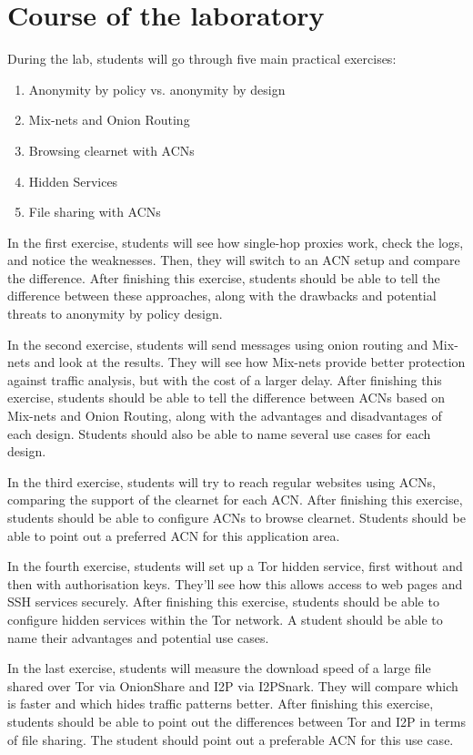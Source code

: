 \section{Course of the laboratory}
During the lab, students will go through five main practical exercises:
\begin{enumerate}
    \item Anonymity by policy vs. anonymity by design
    \item Mix-nets and Onion Routing
    \item Browsing clearnet with ACNs
    \item Hidden Services
    \item File sharing with ACNs
\end{enumerate}

In the first exercise, students will see how single-hop proxies work, check the logs, and notice the weaknesses. Then, they will switch to an ACN setup and compare the difference. After finishing this exercise, students should be able to tell the difference between these approaches, along with the drawbacks and potential threats to anonymity by policy design.

In the second exercise, students will send messages using onion routing and Mix-nets and look at the results. They will see how Mix-nets provide better protection against traffic analysis, but with the cost of a larger delay. After finishing this exercise, students should be able to tell the difference between ACNs based on Mix-nets and Onion Routing, along with the advantages and disadvantages of each design. Students should also be able to name several use cases for each design.

In the third exercise, students will try to reach regular websites using ACNs, comparing the support of the clearnet for each ACN. After finishing this exercise, students should be able to configure ACNs to browse clearnet. Students should be able to point out a preferred ACN for this application area.

In the fourth exercise, students will set up a Tor hidden service, first without and then with authorisation keys. They’ll see how this allows access to web pages and SSH services securely. After finishing this exercise, students should be able to configure hidden services within the Tor network. A student should be able to name their advantages and potential use cases.

In the last exercise, students will measure the download speed of a large file shared over Tor via OnionShare and I2P via I2PSnark. They will compare which is faster and which hides traffic patterns better. After finishing this exercise, students should be able to point out the differences between Tor and I2P in terms of file sharing. The student should point out a preferable ACN for this use case.

